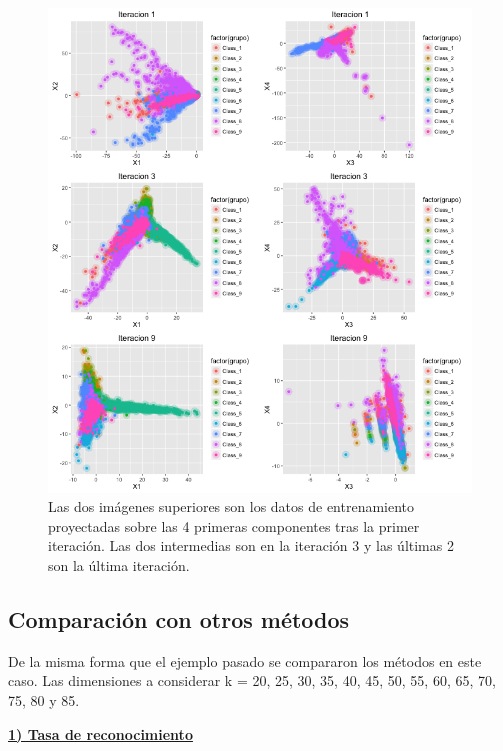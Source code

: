 \begin{figure}[!ht]
  \centering
  \includegraphics[width=1\textwidth]{Figures/Chapter4_ejemplo20componentes_Otto.png} 
  \caption[Ejemplo de proyección en 20 dimensiones (Otto Group)]
  {Las dos imágenes superiores son los datos de entrenamiento proyectadas sobre las 4 primeras componentes tras la primer iteración. Las dos intermedias son en la iteración 3 y las últimas 2 son la última iteración.}
\end{figure}


\subsection{Comparación con otros métodos}

De la misma forma que el ejemplo pasado se compararon los métodos en este caso. Las dimensiones a considerar k = 20, 25, 30, 35, 40, 45, 50, 55, 60, 65, 70, 75, 80 y 85. 

\underline{\textbf{1) Tasa de reconocimiento}}

